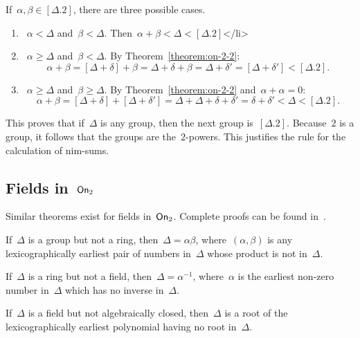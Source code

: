 If~$\alpha, \beta \in [\Delta.2]$, there are three possible cases.
\begin{enumerate}
  \item~$\alpha < \Delta$ and~$\beta < \Delta$. Then~$\alpha + \beta < \Delta < [\Delta.2]$</li>
  \item~$\alpha \geq \Delta$ and~$\beta < \Delta$. By Theorem~\ref{theorem:on-2-2}:
    \begin{equation}
      \alpha + \beta = [\Delta + \delta] + \beta = \Delta + \delta + \beta = \Delta + \delta' = [\Delta + \delta'] < [\Delta.2].
    \end{equation}
  \item~$\alpha \geq \Delta$ and~$\beta \geq \Delta$. By Theorem~\ref{theorem:on-2-2} and~$\alpha + \alpha = 0$:
    \begin{equation}
      \alpha + \beta = [\Delta + \delta] + [\Delta + \delta'] = \Delta + \Delta + \delta + \delta' = \delta + \delta' < \Delta < [\Delta.2].
    \end{equation}
\end{enumerate}
This proves that if~$\Delta$ is any group, then the next group is~$[\Delta.2]$. Because~$2$ is a group, it follows that the groups are the~$2$-powers. This justifies the rule for the calculation of nim-sums.

\subsection{Fields in~$\operatorname{\mathsf{On}}_2$}
Similar theorems exist for fields in~$\operatorname{\mathsf{On}}_2$. Complete proofs can be found in~\cite{on-numbers-and-games}.

\begin{theorem}
  If~$\Delta$ is a group but not a ring, then~$\Delta = \alpha\beta$, where~$(\alpha, \beta)$ is any lexicographically earliest pair of numbers in~$\Delta$ whose product is not in~$\Delta$.
  \label{theorem:on-2-3}
\end{theorem}

\begin{theorem}
  If~$\Delta$ is a ring but not a field, then~$\Delta = \alpha^{-1}$, where~$\alpha$ is the earliest non-zero number in~$\Delta$ which has no inverse in~$\Delta$.
  \label{theorem:on-2-4}
\end{theorem}

\begin{theorem}
  If~$\Delta$ is a field but not algebraically closed, then~$\Delta$ is a root of the lexicographically earliest polynomial having no root in~$\Delta$.
  \label{theorem:on-2-5}
\end{theorem}


